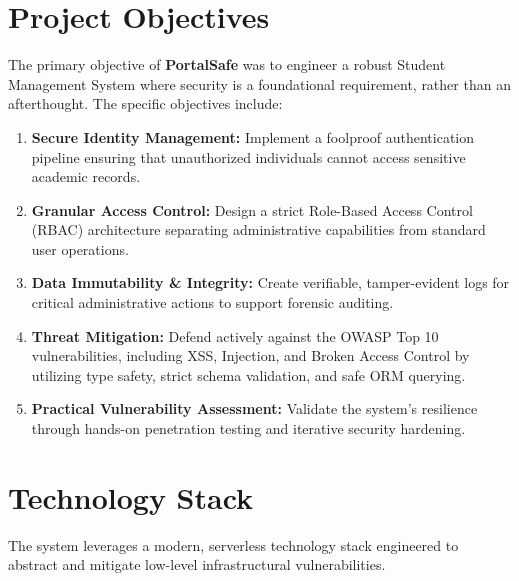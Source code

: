 \documentclass[12pt,a4paper]{report}
\begin{document}
\tableofcontents
\listoffigures
\listoftables

\chapter{Project Objectives}
The primary objective of \textbf{PortalSafe} was to engineer a robust Student Management System where security is a foundational requirement, rather than an afterthought. The specific objectives include:
\begin{enumerate}
    \item \textbf{Secure Identity Management:} Implement a foolproof authentication pipeline ensuring that unauthorized individuals cannot access sensitive academic records.
    \item \textbf{Granular Access Control:} Design a strict Role-Based Access Control (RBAC) architecture separating administrative capabilities from standard user operations.
    \item \textbf{Data Immutability \& Integrity:} Create verifiable, tamper-evident logs for critical administrative actions to support forensic auditing.
    \item \textbf{Threat Mitigation:} Defend actively against the OWASP Top 10 vulnerabilities, including XSS, Injection, and Broken Access Control by utilizing type safety, strict schema validation, and safe ORM querying.
    \item \textbf{Practical Vulnerability Assessment:} Validate the system’s resilience through hands-on penetration testing and iterative security hardening.
\end{enumerate}

\chapter{Technology Stack}
The system leverages a modern, serverless technology stack engineered to abstract and mitigate low-level infrastructural vulnerabilities.
\end{document}
